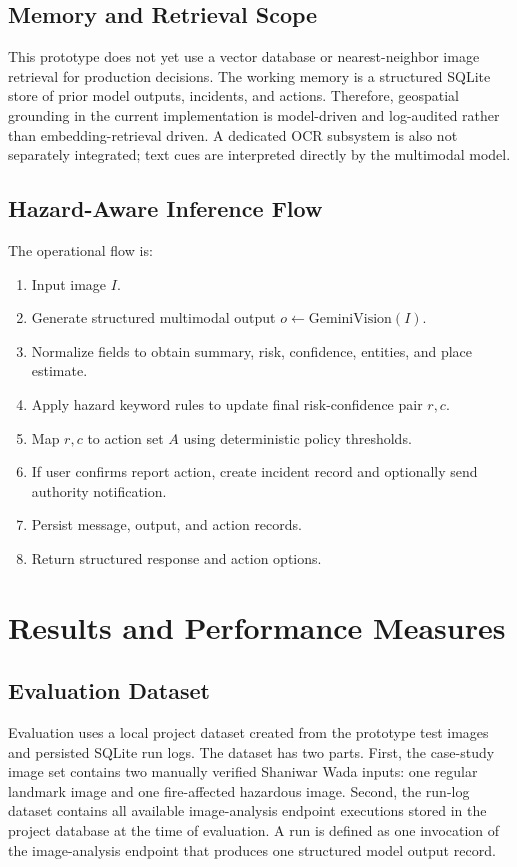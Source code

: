 \documentclass[12pt,a4paper]{article}
\begin{document}
\subsection{Memory and Retrieval Scope}
This prototype does not yet use a vector database or nearest-neighbor image retrieval for production decisions. The working memory is a structured SQLite store of prior model outputs, incidents, and actions. Therefore, geospatial grounding in the current implementation is model-driven and log-audited rather than embedding-retrieval driven. A dedicated OCR subsystem is also not separately integrated; text cues are interpreted directly by the multimodal model.

\subsection{Hazard-Aware Inference Flow}
The operational flow is:
\begin{enumerate}
\item Input image $I$.
\item Generate structured multimodal output $o \leftarrow \mathrm{GeminiVision}(I)$.
\item Normalize fields to obtain summary, risk, confidence, entities, and place estimate.
\item Apply hazard keyword rules to update final risk-confidence pair $r,c$.
\item Map $r,c$ to action set $A$ using deterministic policy thresholds.
\item If user confirms report action, create incident record and optionally send authority notification.
\item Persist message, output, and action records.
\item Return structured response and action options.
\end{enumerate}

\section{Results and Performance Measures}

\subsection{Evaluation Dataset}
Evaluation uses a local project dataset created from the prototype test images and persisted SQLite run logs. The dataset has two parts. First, the case-study image set contains two manually verified Shaniwar Wada inputs: one regular landmark image and one fire-affected hazardous image. Second, the run-log dataset contains all available image-analysis endpoint executions stored in the project database at the time of evaluation. A run is defined as one invocation of the image-analysis endpoint that produces one structured model output record.
\end{document}
